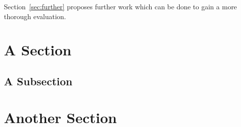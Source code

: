 
Section~\ref{sec:further} proposes further work which can be done to gain a more thorough evaluation.


\section{A Section}



\subsection{A Subsection}



\section{Another Section}


